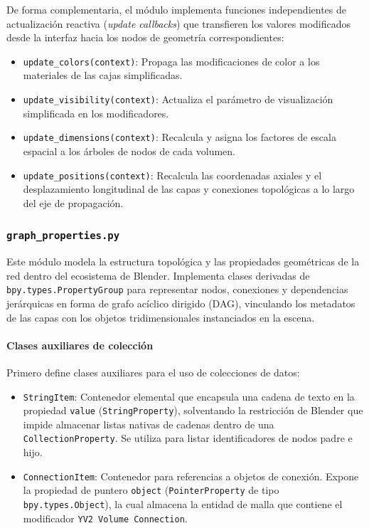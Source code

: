 De forma complementaria, el módulo implementa funciones independientes de actualización reactiva (\textit{update callbacks}) que 
transfieren los valores modificados desde la interfaz hacia los nodos de geometría correspondientes:
\begin{itemize}
    \item \texttt{update\_colors(context)}: Propaga las modificaciones de color a los materiales de las cajas simplificadas.
    \item \texttt{update\_visibility(context)}: Actualiza el parámetro de visualización simplificada en los modificadores.
    \item \texttt{update\_dimensions(context)}: Recalcula y asigna los factores de escala espacial a los árboles de nodos de cada volumen.
    \item \texttt{update\_positions(context)}: Recalcula las coordenadas axiales y el desplazamiento longitudinal de las capas y conexiones 
    topológicas a lo largo del eje de propagación.
\end{itemize}

\subsubsection{\texttt{graph\_properties.py}}
Este módulo modela la estructura topológica y las propiedades geométricas de la red dentro del ecosistema de Blender. 
Implementa clases derivadas de \texttt{bpy.types.PropertyGroup} para representar nodos, conexiones y dependencias jerárquicas en 
forma de grafo acíclico dirigido (DAG), vinculando los metadatos de las capas con los objetos tridimensionales instanciados en la escena.

\paragraph{Clases auxiliares de colección}
Primero define clases auxiliares para el uso de colecciones de datos:
\begin{itemize}
    \item \texttt{StringItem}: Contenedor elemental que encapsula una cadena de texto en la propiedad 
    \texttt{value} (\texttt{StringProperty}), solventando la restricción de Blender que impide almacenar 
    listas nativas de cadenas dentro de una \texttt{CollectionProperty}. Se utiliza para listar identificadores de nodos padre e hijo.
    \item \texttt{ConnectionItem}: Contenedor para referencias a objetos de conexión. Expone la propiedad 
    de puntero \texttt{object} (\texttt{PointerProperty} de tipo \texttt{bpy.types.Object}), la cual almacena 
    la entidad de malla que contiene el modificador \texttt{YV2 Volume Connection}.
\end{itemize}

